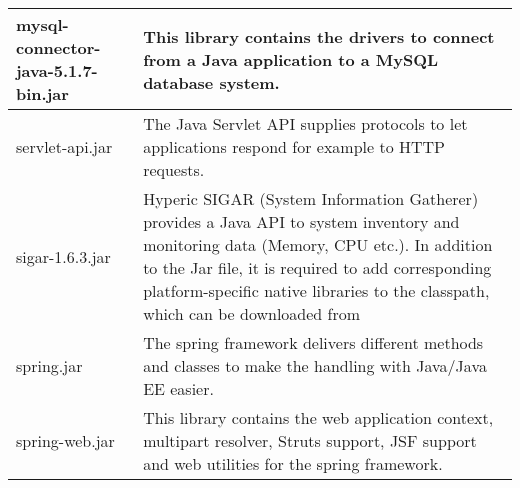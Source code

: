 \begin{center}
\begin{longtable}{|p{}|p{}|}
\hline 
mysql-connector-java-5.1.7-bin.jar & This library contains the drivers to connect from a Java application to a MySQL database system.\\
\hline 
servlet-api.jar & The Java Servlet API supplies protocols to let applications respond for example to HTTP requests.\\
\hline 
sigar-1.6.3.jar & Hyperic SIGAR (System Information Gatherer) provides a Java API to system inventory and monitoring data (Memory, CPU etc.). In addition to the Jar file, it is required to add corresponding platform-specific native libraries to the classpath, which can be downloaded from~\\
\hline 
spring.jar & The spring framework delivers different methods and classes to make the handling with Java/Java EE easier.\\
\hline 
spring-web.jar & This library contains the web application context, multipart resolver, Struts support, JSF support and web utilities for the spring framework.\\
\hline 
\end{longtable}
\label{tabular:libraries}
\end{center}
